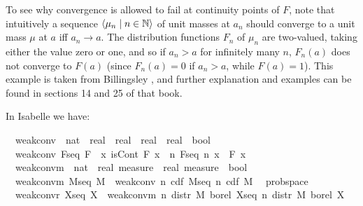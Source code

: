 \documentclass[leqno]{article}
\theoremstyle{definition}
\newcommand{\bldseq}[2]{\langle{#1}\mid{#2}\rangle}
\begin{document}
To see why convergence is allowed to fail at continuity points of $F$, note that intuitively a sequence $\bldseq{\mu_n}{n \in \N}$ of unit masses at $a_n$ should converge to a unit mass $\mu$ at $a$ iff $a_n \rightarrow a$. The distribution functions $F_n$ of $\mu_n$ are two-valued, taking either the value zero or one, and so if $a_n > a$ for infinitely many $n$, $F_n(a)$ does not converge to $F(a)$ (since $F_n(a) = 0$ if $a_n > a$, while $F(a) = 1$). This example is taken from Billingsley \cite{billingsley}, and further explanation and examples can be found in sections 14 and 25 of that book.

In Isabelle we have:

\medskip

\begin{isabellebody}
\isamarkupfalse%
\isanewline
\ \ weak{\isacharunderscore}conv\ {\isacharcolon}{\isacharcolon}\ {\isachardoublequoteopen}{\isacharparenleft}nat\ {\isasymRightarrow}\ {\isacharparenleft}real\ {\isasymRightarrow}\ real{\isacharparenright}{\isacharparenright}\ {\isasymRightarrow}\ {\isacharparenleft}real\ {\isasymRightarrow}\ real{\isacharparenright}\ {\isasymRightarrow}\ bool{\isachardoublequoteclose}\isanewline
{}\isanewline
\ \ {\isachardoublequoteopen}weak{\isacharunderscore}conv\ F{\isacharunderscore}seq\ F\ {\isasymequiv}\ {\isasymforall}x{\isachardot}\ isCont\ F\ x\ {\isasymlongrightarrow}\ {\isacharparenleft}{\isasymlambda}n{\isachardot}\ F{\isacharunderscore}seq\ n\ x{\isacharparenright}\ {\isacharminus}{\isacharminus}{\isacharminus}{\isacharminus}{\isachargreater}\ F\ x{\isachardoublequoteclose}\isanewline\isanewline
{}\isamarkupfalse%
\isanewline
\ \ weak{\isacharunderscore}conv{\isacharunderscore}m\ {\isacharcolon}{\isacharcolon}\ {\isachardoublequoteopen}{\isacharparenleft}nat\ {\isasymRightarrow}\ real\ measure{\isacharparenright}\ {\isasymRightarrow}\ real\ measure\ {\isasymRightarrow}\ bool{\isachardoublequoteclose}\isanewline
{}\isanewline
\ \ {\isachardoublequoteopen}weak{\isacharunderscore}conv{\isacharunderscore}m\ M{\isacharunderscore}seq\ M\ {\isasymequiv}\ weak{\isacharunderscore}conv\ {\isacharparenleft}{\isasymlambda}n{\isachardot}\ cdf\ {\isacharparenleft}M{\isacharunderscore}seq\ n{\isacharparenright}{\isacharparenright}\ {\isacharparenleft}cdf\ M{\isacharparenright}{\isachardoublequoteclose}\isanewline\isanewline
{}\isamarkupfalse%
\ {\isacharparenleft}\ prob{\isacharunderscore}space{\isacharparenright}\isanewline
\ \ {\isachardoublequoteopen}weak{\isacharunderscore}conv{\isacharunderscore}r\ X{\isacharunderscore}seq\ X\ {\isasymequiv}\ weak{\isacharunderscore}conv{\isacharunderscore}m\ {\isacharparenleft}{\isasymlambda}n{\isachardot}\ distr\ M\ borel\ {\isacharparenleft}X{\isacharunderscore}seq\ n{\isacharparenright}{\isacharparenright}\ {\isacharparenleft}distr\ M\ borel\ X{\isacharparenright}{\isachardoublequoteclose}
\end{isabellebody}
\end{document}
